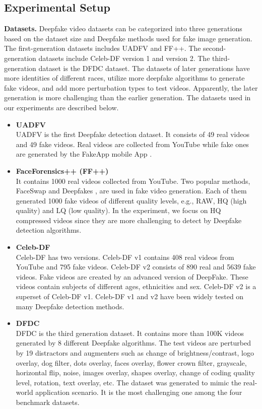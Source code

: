 \documentclass[main, biber]{now-journal}
\begin{document}
\subsection{Experimental Setup}\label{subsec:setup}

{\bf Datasets.} Deepfake video datasets can be categorized into three
generations based on the dataset size and Deepfake methods used for fake
image generation. The first-generation datasets includes UADFV and FF++.
The second-generation datasets include Celeb-DF version 1 and version 2.
The third-generation dataset is the DFDC dataset.  The datasets of later
generations have more identities of different races, utilize more
deepfake algorithms to generate fake videos, and add more perturbation
types to test videos. Apparently, the later generation is more
challenging than the earlier generation. The datasets used in our
experiments are described below.

\begin{itemize}
\item {\bf UADFV} \citep{li2018exposing} \\
UADFV is the first Deepfake detection dataset. It consists of 49 real
videos and 49 fake videos.  Real videos are collected from YouTube while
fake ones are generated by the FakeApp mobile App \citep{Fakeapp}.
\item {\bf FaceForensics++ (FF++)} \citep{rossler2019faceforensics++} \\
It contains 1000 real videos collected from YouTube. Two popular
methods, FaceSwap \citep{Kowalski2016} and Deepfakes
\citep{Deepfakes2018}, are used in fake video generation. Each of them
generated 1000 fake videos of different quality levels, e.g., RAW, HQ
(high quality) and LQ (low quality). In the experiment, we focus on HQ
compressed videos since they are more challenging to detect by Deepfake
detection algorithms. 
\item {\bf Celeb-DF} \citep{li2020celeb} \\
Celeb-DF has two versions. Celeb-DF v1 contains 408 real videos from
YouTube and 795 fake videos.  Celeb-DF v2 consists of 890 real and 5639
fake videos.  Fake videos are created by an advanced version of
DeepFake. These videos contain subjects of different ages, ethnicities
and sex. Celeb-DF v2 is a superset of Celeb-DF v1.  Celeb-DF v1 and v2
have been widely tested on many Deepfake detection methods. 
\item {\bf DFDC} \citep{dolhansky2020deepfake} \\
DFDC is the third generation dataset. It contains more than 100K videos
generated by 8 different Deepfake algorithms. The test videos are
perturbed by 19 distractors and augmenters such as change of
brightness/contrast, logo overlay, dog filter, dots overlay, faces
overlay, flower crown filter, grayscale, horizontal flip, noise, images
overlay, shapes overlay, change of coding quality level, rotation, text
overlay, etc. The dataset was generated to mimic the real-world application 
scenario. It is the most challenging one among the four benchmark datasets. 
\end{itemize}
\end{document}
